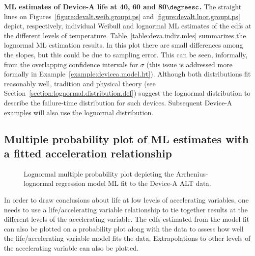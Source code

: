 \begin{example}{\bf ML estimates of Device-A life
at 40, 60 and 80$\degreesc$.}
\label{example:devicea.mle}
The straight lines on Figures~\ref{figure:devalt.weib.groupi.ps} and 
\ref{figure:devalt.lnor.groupi.ps} depict, respectively, individual
Weibull and lognormal ML estimates of the cdfs at the different
levels of temperature.  Table~\ref{table:deva.indiv.mles} summarizes
the lognormal ML estimation results. In this plot there are small
differences among the slopes, but this could be due to sampling
error. This can be seen, informally, from the overlapping confidence
intervals for $\sigma$ (this issue is addressed more formally in
Example~\ref{example:devicea.model.lrt}).  Although both
distributions fit reasonably well, tradition and physical theory
(see Section~\ref{section:lognormal.distribution.def}) suggest the
lognormal distribution to describe the failure-time distribution for
such devices.  Subsequent Device-A examples will also use the
lognormal distribution.
\end{example}

\subsection{Multiple probability plot of
ML estimates with a fitted acceleration relationship}
\label{section:mpplot}
\begin{figure}
\caption{Lognormal multiple probability plot depicting
the Arrhenius-lognormal regression model
ML fit to the Device-A ALT data.}
\label{figure:devalt.lnor.groupm.ps}
\end{figure}

In order to draw conclusions about life at low levels of
accelerating variables, one needs to use a life/accelerating
variable relationship to tie together results at the different
levels of the accelerating variable. The cdfs estimated from the
model fit can also be plotted on a probability plot along with the
data to assess how well the life/accelerating variable model fits
the data. Extrapolations to other levels of the accelerating
variable can also be plotted.

